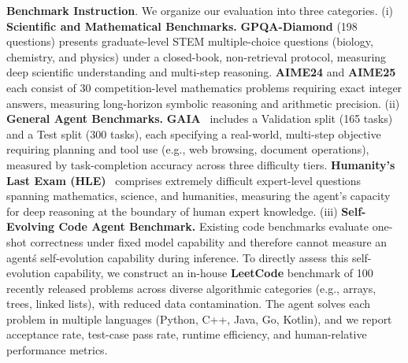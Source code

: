 \documentclass{article}
\theoremstyle{plain}
\theoremstyle{definition}
\theoremstyle{remark}
\begin{document}
\textbf{Benchmark Instruction}. We organize our evaluation into three categories. (i) \textbf{ Scientific and Mathematical Benchmarks.} \textbf{GPQA-Diamond} (198 questions) presents graduate-level STEM multiple-choice questions (biology, chemistry, and physics) under a closed-book, non-retrieval protocol, measuring deep scientific understanding and multi-step reasoning. \textbf{AIME24} and \textbf{AIME25} each consist of 30 competition-level mathematics problems requiring exact integer answers, measuring long-horizon symbolic reasoning and arithmetic precision. (ii) \textbf{ General Agent Benchmarks.} \textbf{GAIA}~\citep{mialon2023gaia} includes a Validation split (165 tasks) and a Test split (300 tasks), each specifying a real-world, multi-step objective requiring planning and tool use (e.g., web browsing, document operations), measured by task-completion accuracy across three difficulty tiers. \textbf{Humanity's Last Exam (HLE)}~\citep{phan2025humanity} comprises extremely difficult expert-level questions spanning mathematics, science, and humanities, measuring the agent's capacity for deep reasoning at the boundary of human expert knowledge. (iii) \textbf{Self-Evolving Code Agent Benchmark.} Existing code benchmarks evaluate one-shot correctness under fixed model capability and therefore cannot measure an agent\'s self-evolution capability during inference. To directly assess this self-evolution capability, we construct an in-house \textbf{LeetCode} benchmark of 100 recently released problems across diverse algorithmic categories (e.g., arrays, trees, linked lists), with reduced data contamination. The agent solves each problem in multiple languages (Python, C++, Java, Go, Kotlin), and we report acceptance rate, test-case pass rate, runtime efficiency, and human-relative performance metrics.
\end{document}
